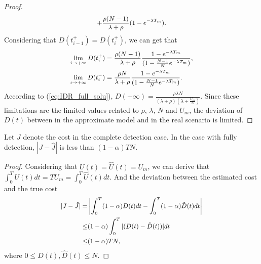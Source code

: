 \begin{proof}
\begin{equation}
\begin{small}
\begin{aligned}
+ \frac{\rho (N-1)}{\lambda + \rho} (1 - e^{-\lambda T_{m}}).
\end{aligned}
\end{small}
\end{equation}
Considering that $D(t_{i-1}^{+}) = D(t_{i}^{+})$, we can get that
\begin{equation}
\begin{small}
\nonumber
\begin{aligned}
\lim_{i \rightarrow +\infty} D(t_{i}^{+}) &=
\frac{\rho(N-1)}{\lambda+\rho} \frac{1 - e^{-\lambda T_{m}}}
{(1 - \frac{N-1}{N}e^{-\lambda T_{m}})}, \\
\lim_{i \rightarrow +\infty} D(t_{i}^{-}) &=
\frac{\rho N}{\lambda+\rho} \frac{1 - e^{-\lambda T_{m}}}
{(1 - \frac{N-1}{N}e^{-\lambda T_{m}})}. \\
\end{aligned}
\end{small}
\end{equation}
According to (\ref{eq:IDR_full_solu}),
$D(+\infty) = \frac{\rho \lambda N}
{(\lambda + \rho)(\lambda + \frac{U_{m}}{N})}$.
Since these limitations are the limited values related to
$\rho$, $\lambda$, $N$ and $U_{m}$,
the deviation of $D(t)$ between in the approximate model
and in the real scenario is limited.
\end{proof}

\begin{lem}\label{lem:Jnear}
Let $J$ denote the cost in the complete detection case.
In the case with fully detection,
$|J - \hat{J}|$ is less than $(1-\alpha) T N$.
\end{lem}
\begin{proof}
Considering that $U(t) = \hat{U}(t) = U_{m}$,
we can derive that $\int_{0}^{T} U(t) dt = T U_{m} = \int_{0}^{T} \hat{U}(t) dt $.
And the deviation between the estimated cost and the true cost
\begin{equation}
\begin{small}
\label{eq:delta_J}
\begin{aligned}
|J - \hat{J}| = & \left| \int_{0}^{T} (1-\alpha)D(t) dt 
- \int_{0}^{T} (1-\alpha) \hat{D}(t) dt \right| \\
\le & (1-\alpha) \int_{0}^{T} |(D(t)-\hat{D}(t))| dt \\
\le & (1-\alpha) T N,
\end{aligned}
\end{small}
\end{equation}
where $0 \le D(t), \hat{D}(t) \le N$.
\end{proof}

